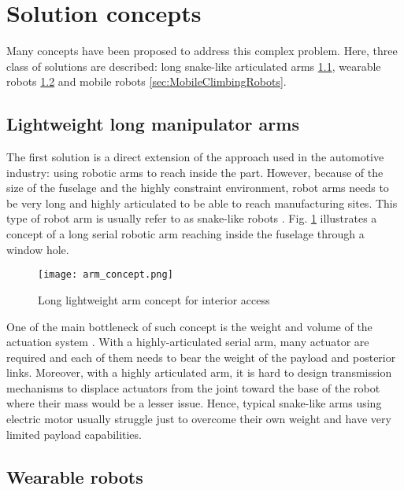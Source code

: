 \section{Solution concepts}

Many concepts have been proposed to address this complex problem. Here, three class of solutions are described: long snake-like articulated arms \ref{sec:LightWeightLongManipulatorArm}, wearable robots \ref{sec:WearableRobots} and mobile robots \ref{sec:MobileClimbingRobots}.

\subsection{Lightweight long manipulator arms}
\label{sec:LightWeightLongManipulatorArm}

The first solution is a direct extension of the approach used in the automotive industry: using robotic arms to reach inside the part. However, because of the size of the fuselage and the highly constraint environment, robot arms needs to be very long and highly articulated to be able to reach manufacturing sites. This type of robot arm is usually refer to as snake-like robots \cite{buckingham_snake-arm_2007}. Fig. \ref{fig:arm_concept} illustrates a concept of a long serial robotic arm reaching inside the fuselage through a window hole.

\begin{figure}[H]
	\centering
		\texttt{[image: arm\_concept.png]}
		\caption{Long lightweight arm concept for interior access}
	\label{fig:arm_concept}
\end{figure}

One of the main bottleneck of such concept is the weight and volume of the actuation system \cite{roy_nonlinear_2009}. With a highly-articulated serial arm, many actuator are required and each of them needs to bear the weight of the payload and posterior links. Moreover, with a highly articulated arm, it is hard to design transmission mechanisms to displace actuators from the joint toward the base of the robot where their mass would be a lesser issue. Hence, typical snake-like arms using electric motor usually struggle just to overcome their own weight and have very limited payload capabilities.


\subsection{Wearable robots}
\label{sec:WearableRobots}

